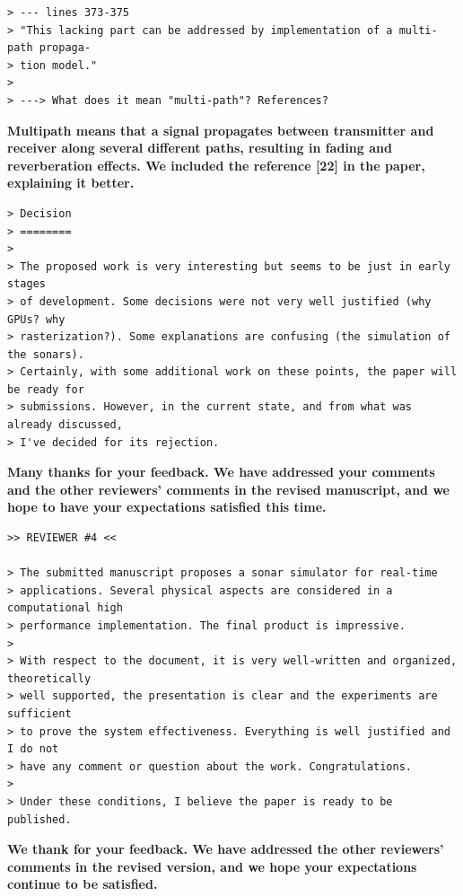 \documentclass{article}
\begin{document}
\begin{verbatim}
> --- lines 373-375
> "This lacking part can be addressed by implementation of a multi-path propaga-
> tion model."
>
> ---> What does it mean "multi-path"? References?
\end{verbatim}

\textbf{Multipath means that a signal propagates between transmitter and receiver along several different paths, resulting in fading and reverberation effects. We included the reference [22] in the paper, explaining it better.}

\begin{verbatim}
> Decision
> ========
>
> The proposed work is very interesting but seems to be just in early stages
> of development. Some decisions were not very well justified (why GPUs? why
> rasterization?). Some explanations are confusing (the simulation of the sonars).
> Certainly, with some additional work on these points, the paper will be ready for
> submissions. However, in the current state, and from what was already discussed,
> I've decided for its rejection.
\end{verbatim}

\textbf{Many thanks for your feedback. We have addressed your comments and the other reviewers' comments in the revised manuscript, and we hope to have your expectations satisfied this time.}

\begin{verbatim}
>> REVIEWER #4 <<

> The submitted manuscript proposes a sonar simulator for real-time
> applications. Several physical aspects are considered in a computational high
> performance implementation. The final product is impressive.
>
> With respect to the document, it is very well-written and organized, theoretically
> well supported, the presentation is clear and the experiments are sufficient
> to prove the system effectiveness. Everything is well justified and I do not
> have any comment or question about the work. Congratulations.
>
> Under these conditions, I believe the paper is ready to be published.
\end{verbatim}

\textbf{We thank for your feedback. We have addressed the other reviewers' comments in the revised version, and we hope your expectations continue to be satisfied.}
\end{document}
